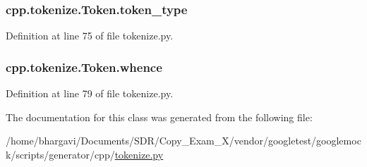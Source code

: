 \subsubsection[{\texorpdfstring{token\+\_\+type}{token_type}}]{\setlength{\rightskip}{0pt plus 5cm}cpp.\+tokenize.\+Token.\+token\+\_\+type}\hypertarget{classcpp_1_1tokenize_1_1_token_a60c6e5120f3947885f10788ceb69a660}{}\label{classcpp_1_1tokenize_1_1_token_a60c6e5120f3947885f10788ceb69a660}


Definition at line 75 of file tokenize.\+py.

\subsubsection[{\texorpdfstring{whence}{whence}}]{\setlength{\rightskip}{0pt plus 5cm}cpp.\+tokenize.\+Token.\+whence}\hypertarget{classcpp_1_1tokenize_1_1_token_a9d3a8011707ede6be85987d74f88848d}{}\label{classcpp_1_1tokenize_1_1_token_a9d3a8011707ede6be85987d74f88848d}


Definition at line 79 of file tokenize.\+py.



The documentation for this class was generated from the following file\+:\begin{DoxyCompactItemize}
\item 
/home/bhargavi/\+Documents/\+S\+D\+R/\+Copy\+\_\+\+Exam\+\_\+X/vendor/googletest/googlemock/scripts/generator/cpp/\hyperlink{tokenize_8py}{tokenize.\+py}\end{DoxyCompactItemize}
